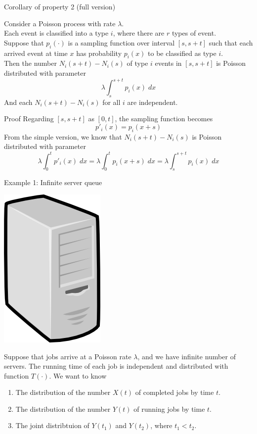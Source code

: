 \documentclass[mathserif]{beamer}
\begin{document}
\begin{frame}{Corollary of property 2 (full version)}
\begin{corollary}
Consider a Poisson process with rate $\lambda$.\\
Each event is classified into a type $i$, where there are $r$ types of event. \\
Suppose that $p_i(\cdot)$ is a sampling function over interval $[s,s+t]$ such that
each arrived event at time $x$ has probability $p_i(x)$ to be classified as type $i$.\\
Then the number $N_i(s+t)-N_i(s)$ of type $i$ events in $[s,s+t]$ is Poisson distributed with parameter
\[
\lambda \int_s^{s+t} p_i(x)\;dx
\]
And each $N_i(s+t)-N_i(s)$ for all $i$ are independent.
\end{corollary}
\end{frame}

\begin{frame}{Proof}
Regarding $[s, s+t]$ as $[0,t]$, the sampling function becomes
\[
p'_i(x) = p_i(x+s)
\]
From the simple version, we know that $N_i(s+t)-N_i(s)$ is Poisson distributed with parameter
\[
\lambda\int_0^t p'_i(x)\;dx = \lambda\int_0^t p_i(x+s)\;dx = \lambda\int_s^{s+t} p_i(x)\;dx
\]
\end{frame}

\begin{frame}{Example 1: Infinite server queue}
\begin{center}
\includegraphics[scale=0.13]{server.png}
\end{center}
Suppose that jobs arrive at a Poisson rate $\lambda$, and we have infinite number of servers.
The running time of each job is independent and distributed with function $T(\cdot)$.
We want to know
\begin{enumerate}
\item The distribution of the number $X(t)$ of completed jobs by time $t$.
\item The distribution of the number $Y(t)$ of running jobs by time $t$.
\item The joint distribtuion of $Y(t_1)$ and $Y(t_2)$, where $t_1 < t_2$.
\end{enumerate}
\end{frame}
\end{document}
